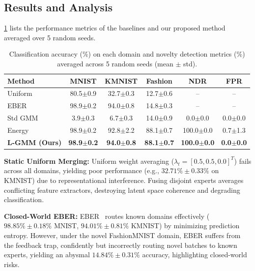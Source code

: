\documentclass{article}
\theoremstyle{plain}
\theoremstyle{definition}
\theoremstyle{remark}
\begin{document}
\subsection{Results and Analysis}

\cref{table:main_results} lists the performance metrics of the baselines and our proposed method averaged over 5 random seeds.

\begin{table}[ht]
\vspace{-8pt}
\caption{Classification accuracy (\%) on each domain and novelty detection metrics (\%) averaged across 5 random seeds (mean $\pm$ std).}
\label{table:main_results}
\vspace{-5pt}
\begin{center}
\begin{footnotesize}
\setlength{\tabcolsep}{0.6pt}
\begin{tabular}{lccccc}
\toprule
Method & MNIST & KMNIST & Fashion & NDR & FPR \\
\midrule
Uniform & 80.5{\tiny$\pm$0.9} & 32.7{\tiny$\pm$0.3} & 12.7{\tiny$\pm$0.6} & -- & -- \\
EBER & 98.9{\tiny$\pm$0.2} & 94.0{\tiny$\pm$0.8} & 14.8{\tiny$\pm$0.3} & -- & -- \\
Std GMM & 3.9{\tiny$\pm$0.3} & 6.7{\tiny$\pm$0.3} & 14.0{\tiny$\pm$0.9} & 0.0{\tiny$\pm$0.0} & 0.0{\tiny$\pm$0.0} \\
Energy & 98.9{\tiny$\pm$0.2} & 92.8{\tiny$\pm$2.2} & 88.1{\tiny$\pm$0.7} & 100.0{\tiny$\pm$0.0} & 0.7{\tiny$\pm$1.3} \\
\textbf{L-GMM (Ours)} & \textbf{98.9{\tiny$\pm$0.2}} & \textbf{94.0{\tiny$\pm$0.8}} & \textbf{88.1{\tiny$\pm$0.7}} & \textbf{100.0{\tiny$\pm$0.0}} & \textbf{0.0{\tiny$\pm$0.0}} \\
\bottomrule
\end{tabular}
\end{footnotesize}
\end{center}
\vspace{-15pt}
\end{table}

\textbf{Static Uniform Merging:} Uniform weight averaging ($\lambda_t = [0.5, 0.5, 0.0]^T$) fails across all domains, yielding poor performance (e.g., $32.71\% \pm 0.33\%$ on KMNIST) due to representational interference. Fusing disjoint experts averages conflicting feature extractors, destroying latent space coherence and degrading classification.

\textbf{Closed-World EBER:} EBER~\cite{zhao24} routes known domains effectively ($98.85\% \pm 0.18\%$ MNIST, $94.01\% \pm 0.81\%$ KMNIST) by minimizing prediction entropy. However, under the novel FashionMNIST domain, EBER suffers from the feedback trap, confidently but incorrectly routing novel batches to known experts, yielding an abysmal $14.84\% \pm 0.31\%$ accuracy, highlighting closed-world risks.
\end{document}

